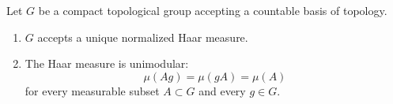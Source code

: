 \begin{theorem} \label{ThoBZBooOTxqcI}
    Let \( G\) be a compact topological group accepting a countable basis of topology.
    \begin{enumerate}
        \item
            \( G\) accepts a unique normalized Haar measure.
        \item
            The Haar measure is unimodular:
	\begin{equation}
		\mu(Ag)=\mu(gA)=\mu(A)
	\end{equation}
    for every measurable subset \( A\subset G\) and every \( g\in G\).
    \end{enumerate}
\end{theorem}
